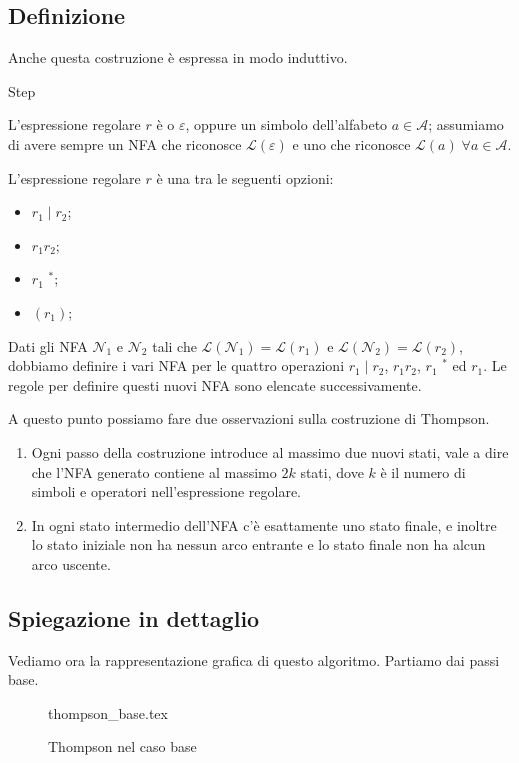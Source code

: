 \documentclass[class=book, crop=false, oneside, 12pt]{standalone}
\begin{document}
\subsection{Definizione}
Anche questa costruzione è espressa in modo induttivo.
\begin{labeling}{Step}
    \item[Base] L'espressione regolare \(r\) è o \(\varepsilon\), oppure un simbolo dell’alfabeto \(a \in \mathcal{A}\); assumiamo di avere sempre un NFA che riconosce \(\mathcal{L}(\varepsilon)\) e uno che riconosce \(\mathcal{L}(a) \; \forall a \in \mathcal{A}\).
    \item[Step] L'espressione regolare \(r\) è una tra le seguenti opzioni: 
    \begin{itemize}[noitemsep]
        \item \(r_1 \mid  r_2 \);
        \item \( r_1 r_2 \); 
        \item \( r_1\) \(^\ast \);
        \item \((r_1)\);
    \end{itemize}
    Dati gli NFA \(\mathcal{N}_1\) e \(\mathcal{N}_2\) tali che \(\mathcal{L}(\mathcal{N}_1)=\mathcal{L}(r_1)\) e \(\mathcal{L}(\mathcal{N}_2) = \mathcal{L}(r_2)\), dobbiamo definire i vari NFA per le quattro operazioni \(r_1 \mid r_2\), \(r_1 r_2\), \(r_1\) \(^\ast\) ed \(r_1\). Le regole per definire questi nuovi NFA sono elencate successivamente.
\end{labeling}
\noindent A questo punto possiamo fare due osservazioni sulla costruzione di Thompson.
\begin{enumerate}
    \item Ogni passo della costruzione introduce al massimo due nuovi stati, vale a dire che l’NFA generato contiene al massimo \(2k\) stati, dove \(k\) è il numero di simboli e operatori nell’espressione regolare.
    \item In ogni stato intermedio dell’NFA c’è esattamente uno stato finale, e inoltre lo stato iniziale non ha nessun arco entrante e lo stato finale non ha alcun arco uscente. 
\end{enumerate}

\subsection{Spiegazione in dettaglio}
Vediamo ora la rappresentazione grafica di questo algoritmo. Partiamo dai passi base.

\begin{figure}[H]
    \centering
    {thompson_base.tex}
    \caption{Thompson nel caso base}
    \label{Thompson_base}
\end{figure}
\end{document}
